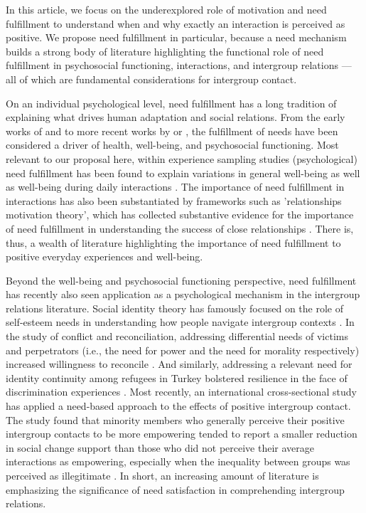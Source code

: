 \documentclass[man, 12pt, a4paper, mask]{apa7}
\theoremstyle{break}
\theoremstyle{plain}
\begin{document}
In this article, we focus on the underexplored role of motivation and need fulfillment to understand when and why exactly an interaction is perceived as positive. We propose need fulfillment in particular, because a need mechanism builds a strong body of literature highlighting the functional role of need fulfillment in psychosocial functioning, interactions, and intergroup relations --- all of which are fundamental considerations for intergroup contact.

On an individual psychological level, need fulfillment has a long tradition of explaining what drives human adaptation and social relations. From the early works of \citet[][]{maslow1943} and \citet[][]{lewin1926e} to more recent works by \citet[][]{Ryan2017} or \citet[][]{Steverink2006}, the fulfillment of needs have been considered a driver of health, well-being, and psychosocial functioning. Most relevant to our proposal here, within experience sampling studies (psychological) need fulfillment has been found to explain variations in general well-being \citep[e.g.,][]{sheldon1996, reis2000} as well as well-being during daily interactions \citep[][]{Downie2008}. The importance of need fulfillment in interactions has also been substantiated by frameworks such as 'relationships motivation theory', which has collected substantive evidence for the importance of need fulfillment in understanding the success of close relationships \citep[e.g., see][]{knee2023}. There is, thus, a wealth of literature highlighting the importance of need fulfillment to positive everyday experiences and well-being.

Beyond the well-being and psychosocial functioning perspective, need fulfillment has recently also seen application as a psychological mechanism in the intergroup relations literature. Social identity theory has famously focused on the role of self-esteem needs in understanding how people navigate intergroup contexts \citep[e.g.,][]{abrams1988}. In the study of conflict and reconciliation, addressing differential needs of victims and perpetrators (i.e., the need for power and the need for morality respectively) increased willingness to reconcile \citep[][]{Shnabel2008}. And similarly, addressing a relevant need for identity continuity among refugees in Turkey bolstered resilience in the face of discrimination experiences \citep[][]{Celebi2017}. Most recently, an international cross-sectional study has applied a need-based approach to the effects of positive intergroup contact. The study found that minority members who generally perceive their positive intergroup contacts to be more empowering tended to report a smaller reduction in social change support than those who did not perceive their average interactions as empowering, especially when the inequality between groups was perceived as illegitimate \citep[][]{Hassler2021}. In short, an increasing amount of literature is emphasizing the significance of need satisfaction in comprehending intergroup relations.
\end{document}
